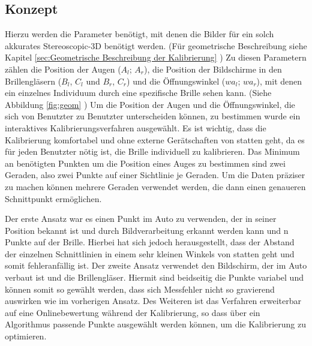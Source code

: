 \subsection{Konzept}
Hierzu werden die Parameter benötigt, mit denen die Bilder für ein solch akkurates Stereoscopic-3D benötigt werden.
(Für geometrische Beschreibung siehe Kapitel \ref{sec:Geometrische Beschreibung der Kalibrierung} )
Zu diesen Parametern zählen die Position der Augen ($A_{l}$; $A_{r}$), die Position der Bildschirme in den Brillengläsern ($B_{l}$, $C_{l}$ und $B_{r}$, $C_{r}$) und die Öffnungswinkel ($wa_{l}$; $wa_{r}$), mit denen ein einzelnes Individuum durch eine spezifische Brille sehen kann. (Siehe Abbildung \ref{fig:geom} )
Um die Position der Augen und die Öffnungswinkel, die sich von Benutzter zu Benutzter unterscheiden können, zu bestimmen wurde ein interaktives Kalibrierungsverfahren ausgewählt. Es ist wichtig, dass die Kalibrierung komfortabel und ohne externe Gerätschaften von statten geht, da es für jeden Benutzter nötig ist, die Brille individuell zu kalibrieren. Das Minimum an benötigten Punkten um die Position eines Auges zu bestimmen sind zwei Geraden, also zwei Punkte auf einer Sichtlinie je Geraden. Um die Daten präziser zu machen können mehrere Geraden verwendet werden, die dann einen genaueren Schnittpunkt ermöglichen. 

Der erste Ansatz war es einen Punkt im Auto zu verwenden, der in seiner Position bekannt ist und durch Bildverarbeitung erkannt werden kann und n Punkte auf der Brille. Hierbei hat sich jedoch herausgestellt, dass der Abstand der einzelnen Schnittlinien in einem sehr kleinen Winkels von statten geht und somit fehleranfällig ist. Der zweite Ansatz verwendet den Bildschirm, der im Auto verbaut ist und die Brillengläser. Hiermit sind beidseitig die Punkte variabel und können somit so gewählt werden, dass sich Messfehler nicht so gravierend auswirken wie im vorherigen Ansatz. Des Weiteren ist das Verfahren erweiterbar auf eine Onlinebewertung während der Kalibrierung, so dass über ein Algorithmus passende Punkte ausgewählt werden können, um die Kalibrierung zu optimieren.

